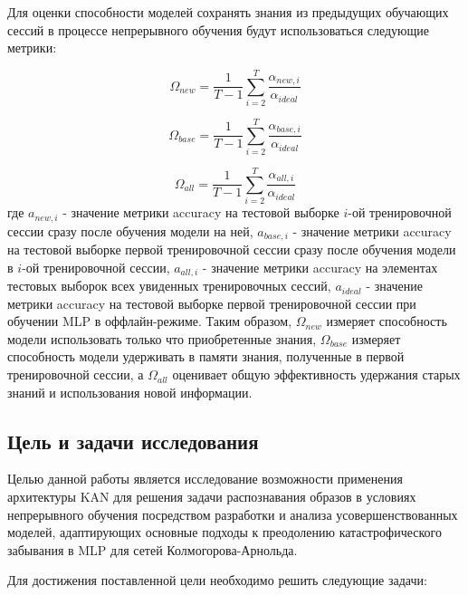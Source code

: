 \documentclass[a4paper,article,14pt]{extarticle}
\begin{document}
Для оценки способности моделей сохранять знания из предыдущих обучающих сессий в 
процессе непрерывного обучения будут использоваться следующие метрики:

\begin{equation}
\Omega_{new} = \frac{1}{T - 1} \sum_{i=2}^{T} \frac{\alpha_{new,i}}{\alpha_{ideal}}
\end{equation}

\begin{equation}
\Omega_{base} = \frac{1}{T - 1} \sum_{i=2}^{T} \frac{\alpha_{base,i}}{\alpha_{ideal}}
\end{equation}

\begin{equation}
\Omega_{all} = \frac{1}{T - 1} \sum_{i=2}^{T} \frac{\alpha_{all,i}}{\alpha_{ideal}}
\end{equation}
где \(a_{new,i}\) - значение метрики accuracy на тестовой выборке \(i\)-ой 
тренировочной сессии сразу после обучения модели на ней, \(a_{base,i}\) - 
значение метрики accuracy на тестовой выборке первой тренировочной сессии сразу 
после обучения модели в \(i\)-ой тренировочной сессии, \(a_{all,i}\) - значение 
метрики accuracy на элементах тестовых выборок всех увиденных тренировочных 
сессий, \(a_{ideal}\) - значение метрики accuracy на тестовой выборке первой 
тренировочной сессии при обучении MLP в оффлайн-режиме. Таким образом, 
\(\Omega_{new}\) измеряет способность модели использовать только что 
приобретенные знания, \(\Omega_{base}\) измеряет способность модели удерживать в 
памяти знания, полученные в первой тренировочной сессии, а \(\Omega_{all}\) 
оценивает общую эффективность удержания старых знаний и использования новой 
информации.

\subsection*{Цель и задачи исследования}

Целью данной работы является исследование возможности применения архитектуры KAN 
для решения задачи распознавания образов в условиях непрерывного обучения 
посредством разработки и анализа усовершенствованных моделей, адаптирующих 
основные подходы к преодолению катастрофического забывания в MLP для сетей 
Колмогорова-Арнольда.

Для достижения поставленной цели необходимо решить следующие задачи:
\end{document}
